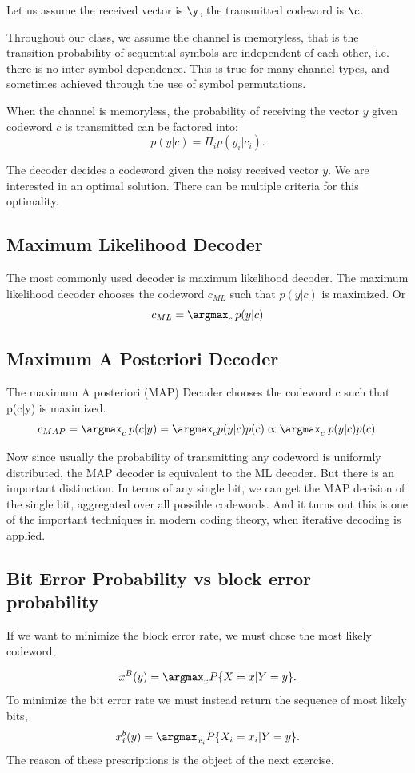 Let us assume the received vector is \(\y\), the transmitted codeword is \(\c\). 

 Throughout our class, we assume the channel is memoryless, that is the transition probability of sequential symbols are independent of each other, i.e. there is no inter-symbol dependence. This is true for many channel types, and sometimes achieved through the use of symbol permutations. 
 
 When the channel is memoryless, the probability of receiving the vector \(y\) given codeword \(c\) is transmitted can be factored into:
\[p(y|c) = \Pi_{i} p(y_i|c_i).\]

 
The decoder decides a codeword given the noisy received vector \(y\). We are interested in an optimal solution. There can be multiple criteria for this optimality.

\subsection{Maximum Likelihood Decoder}
The most commonly used decoder is maximum likelihood decoder. 
The maximum likelihood decoder chooses the codeword \(c_{ML}\) such that \(p(y|c)\) is maximized. Or
\[c_{ML} = \argmax_c \: p(y|c) \]


\subsection{Maximum A Posteriori Decoder} The maximum A posteriori (MAP) Decoder chooses the codeword c such that p(c|y) is maximized. 
\[c_{MAP} = \argmax_c \: p(c|y) = \argmax_c p(y|c)p(c) \propto \argmax_{c} \; p(y|c)p(c).\]

Now since usually the probability of transmitting any codeword is uniformly distributed, the MAP decoder is equivalent to the ML decoder. But there is an important distinction. In terms of any single bit, we can get the MAP decision of the single bit, aggregated over all possible codewords. And it turns out this is one of the important techniques in modern coding theory, when iterative decoding is applied.

\subsection{Bit Error Probability vs block error probability}
 If we want to minimize the block error rate, we must chose the most likely codeword,

 \begin{equation*}
x^{B} ( y ) = \argmax_{x} P \{ X = x
|Y =y\}.    
 \end{equation*}
To minimize the bit error rate we must instead return the sequence of most likely bits,
\begin{equation*}
x_{i}^{b} ( y ) = \argmax_{x_i} P \{ X_i = x_i
|Y=y\}.    
\end{equation*}
The reason of these prescriptions is the object of the next exercise.


